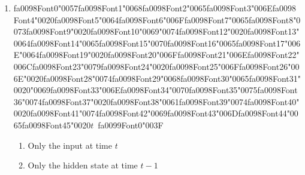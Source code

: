 \documentclass[12pt]{article}
\begin{document}
\begin{enumerate}[label=Q\arabic*.]
\begin{enumerate}[label=(\Alph*)]
    \item The next word given the predicted history
    \item The next word given the ground-truth history
    \item The current word given itself
    \item All words simultaneously
\end{enumerate}
\item {\csname fa0098Font0\endcsname\char"0057}{\csname fa0098Font1\endcsname\char"0068}{\csname fa0098Font2\endcsname\char"0065}{\csname fa0098Font3\endcsname\char"006E}{\csname fa0098Font4\endcsname\char"0020}{\csname fa0098Font5\endcsname\char"0064}{\csname fa0098Font6\endcsname\char"006F}{\csname fa0098Font7\endcsname\char"0065}{\csname fa0098Font8\endcsname\char"0073}{\csname fa0098Font9\endcsname\char"0020}{\csname fa0098Font10\endcsname\char"0069}{\char"0074}{\csname fa0098Font12\endcsname\char"0020}{\csname fa0098Font13\endcsname\char"0064}{\csname fa0098Font14\endcsname\char"0065}{\csname fa0098Font15\endcsname\char"0070}{\csname fa0098Font16\endcsname\char"0065}{\csname fa0098Font17\endcsname\char"006E}{\char"0064}{\csname fa0098Font19\endcsname\char"0020}{\csname fa0098Font20\endcsname\char"006F}{\csname fa0098Font21\endcsname\char"006E}{\csname fa0098Font22\endcsname\char"006C}{\csname fa0098Font23\endcsname\char"0079}{\csname fa0098Font24\endcsname\char"0020}{\csname fa0098Font25\endcsname\char"006F}{\csname fa0098Font26\endcsname\char"006E}{\char"0020}{\csname fa0098Font28\endcsname\char"0074}{\csname fa0098Font29\endcsname\char"0068}{\csname fa0098Font30\endcsname\char"0065}{\csname fa0098Font31\endcsname\char"0020}{\char"0069}{\csname fa0098Font33\endcsname\char"006E}{\csname fa0098Font34\endcsname\char"0070}{\csname fa0098Font35\endcsname\char"0075}{\csname fa0098Font36\endcsname\char"0074}{\csname fa0098Font37\endcsname\char"0020}{\csname fa0098Font38\endcsname\char"0061}{\csname fa0098Font39\endcsname\char"0074}{\csname fa0098Font40\endcsname\char"0020}{\csname fa0098Font41\endcsname\char"0074}{\csname fa0098Font42\endcsname\char"0069}{\csname fa0098Font43\endcsname\char"006D}{\csname fa0098Font44\endcsname\char"0065}{\csname fa0098Font45\endcsname\char"0020}$t$\ {\csname fa0099Font0\endcsname\char"003F}
\begin{enumerate}[label=(\Alph*)]
    \item Only the input at time $t$
    \item Only the hidden state at time $t-1$

\end{enumerate}
\end{enumerate}
\end{document}
